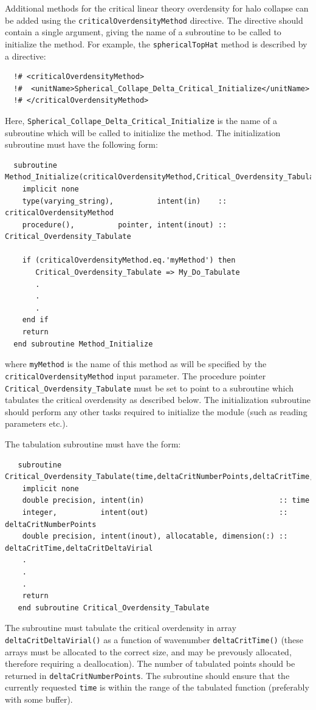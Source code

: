 Additional methods for the critical linear theory overdensity for halo collapse can be added using the {\tt criticalOverdensityMethod} directive. The directive should contain a single argument, giving the name of a subroutine to be called to initialize the method. For example, the {\tt sphericalTopHat} method is described by a directive:
\begin{verbatim}
  !# <criticalOverdensityMethod>
  !#  <unitName>Spherical_Collape_Delta_Critical_Initialize</unitName>
  !# </criticalOverdensityMethod>
\end{verbatim}
Here, {\tt Spherical\_Collape\_Delta\_Critical\_Initialize} is the name of a subroutine which will be called to initialize the method. The initialization subroutine must have the following form:
\begin{verbatim}
  subroutine Method_Initialize(criticalOverdensityMethod,Critical_Overdensity_Tabulate)
    implicit none
    type(varying_string),          intent(in)    :: criticalOverdensityMethod
    procedure(),          pointer, intent(inout) :: Critical_Overdensity_Tabulate
    
    if (criticalOverdensityMethod.eq.'myMethod') then
       Critical_Overdensity_Tabulate => My_Do_Tabulate
       .
       .
       .
    end if
    return
  end subroutine Method_Initialize
\end{verbatim}
where {\tt myMethod} is the name of this method as will be specified by the {\tt criticalOverdensityMethod} input parameter. The procedure pointer {\tt Critical\_Overdensity\_Tabulate} must be set to point to a subroutine which tabulates the critical overdensity as described below. The initialization subroutine should perform any other tasks required to initialize the module (such as reading parameters etc.).

The tabulation subroutine must have the form:
\begin{verbatim}
   subroutine Critical_Overdensity_Tabulate(time,deltaCritNumberPoints,deltaCritTime,deltaCritDeltaCrit)
    implicit none
    double precision, intent(in)                               :: time
    integer,          intent(out)                              :: deltaCritNumberPoints
    double precision, intent(inout), allocatable, dimension(:) :: deltaCritTime,deltaCritDeltaVirial
    .
    .
    .
    return
   end subroutine Critical_Overdensity_Tabulate
\end{verbatim}
The subroutine must tabulate the critical overdensity in array {\tt deltaCritDeltaVirial()} as a function of wavenumber {\tt deltaCritTime()} (these arrays must be allocated to the correct size, and may be prevously allocated, therefore requiring a deallocation). The number of tabulated points should be returned in {\tt deltaCritNumberPoints}. The subroutine should ensure that the currently requested {\tt time} is within the range of the tabulated function (preferably with some buffer).

